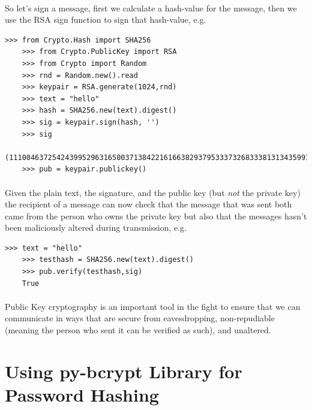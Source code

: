 \documentclass[12pt, a4paper, oneside]{book}
\begin{document}
\paragraph{} So let's sign a message, first we calculate a hash-value for the message, then we use the RSA sign function to sign that hash-value, e.g.

\begin{lstlisting}[style=DOS]
    >>> from Crypto.Hash import SHA256
    >>> from Crypto.PublicKey import RSA
    >>> from Crypto import Random
    >>> rnd = Random.new().read
    >>> keypair = RSA.generate(1024,rnd)
    >>> text = "hello"
    >>> hash = SHA256.new(text).digest()
    >>> sig = keypair.sign(hash, '')
    >>> sig
    (111004637254243995296316500371384221616638293795333732683338131343599162464689495396310140992877093588050236570061389234822100924372155041895989651044833066627302857544152750773907374436456744979379429396104023571661485474683753194948844081967875024033289332359776882595360104731737542292364224609629748624699L,)
    >>> pub = keypair.publickey()
\end{lstlisting}

\paragraph{} Given the plain text, the signature, and the public key (but \emph{not} the private key) the recipient of a message can now check that the message that was sent both came from the person who owns the private key but also that the messages hasn't been maliciously altered during transmission, e.g.

\begin{lstlisting}[style=DOS]
    >>> text = "hello"
    >>> testhash = SHA256.new(text).digest()
    >>> pub.verify(testhash,sig)
    True
\end{lstlisting}

\paragraph{} Public Key cryptography is an important tool in the fight to ensure that we can communicate in ways that are secure from eavesdropping, non-repudiable (meaning the person who sent it can be verified as such), and unaltered.

\section{Using py-bcrypt Library for Password Hashing}
\label{py-bcrypt}
\end{document}
